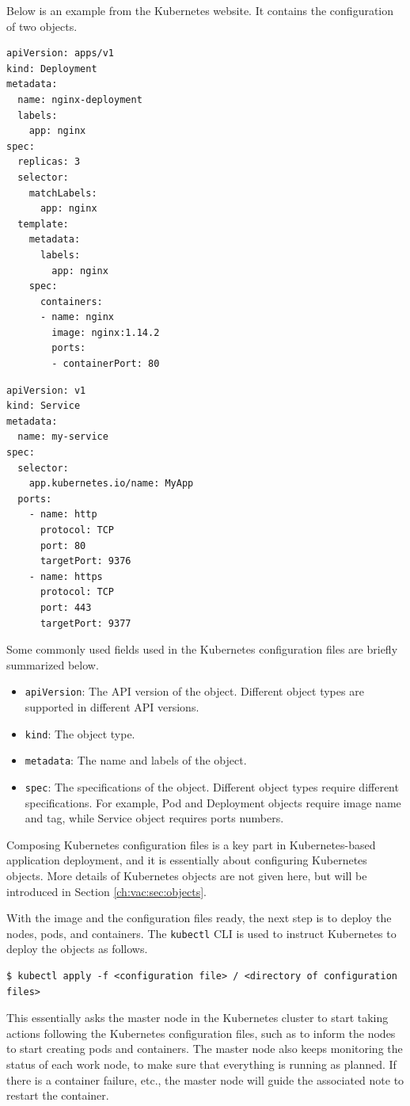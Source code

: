 Below is an example from the Kubernetes website. It contains the configuration of two objects.
\begin{lstlisting}
apiVersion: apps/v1
kind: Deployment
metadata:
  name: nginx-deployment
  labels:
    app: nginx
spec:
  replicas: 3
  selector:
    matchLabels:
      app: nginx
  template:
    metadata:
      labels:
        app: nginx
    spec:
      containers:
      - name: nginx
        image: nginx:1.14.2
        ports:
        - containerPort: 80
\end{lstlisting}

\begin{lstlisting}
apiVersion: v1
kind: Service
metadata:
  name: my-service
spec:
  selector:
    app.kubernetes.io/name: MyApp
  ports:
    - name: http
      protocol: TCP
      port: 80
      targetPort: 9376
    - name: https
      protocol: TCP
      port: 443
      targetPort: 9377
\end{lstlisting}

Some commonly used fields used in the Kubernetes configuration files are briefly summarized below.
\begin{itemize}
	\item \verb|apiVersion|: The API version of the object. Different object types are supported in different API versions.
	\item \verb|kind|: The object type.
	\item \verb|metadata|: The name and labels of the object. 
	\item \verb|spec|: The specifications of the object. Different object types require different specifications. For example, Pod and Deployment objects require image name and tag, while Service object requires ports numbers. 
\end{itemize}

Composing Kubernetes configuration files is a key part in Kubernetes-based application deployment, and it is essentially about configuring Kubernetes objects. More details of Kubernetes objects are not given here, but will be introduced in Section \ref{ch:vac:sec:objects}.

With the image and the configuration files ready, the next step is to deploy the nodes, pods, and containers. The \verb|kubectl| CLI is used to instruct Kubernetes to deploy the objects as follows.
\begin{lstlisting}
$ kubectl apply -f <configuration file> / <directory of configuration files>
\end{lstlisting}
This essentially asks the master node in the Kubernetes cluster to start taking actions following the Kubernetes configuration files, such as to inform the nodes to start creating pods and containers. The master node also keeps monitoring the status of each work node, to make sure that everything is running as planned. If there is a container failure, etc., the master node will guide the associated note to restart the container.


